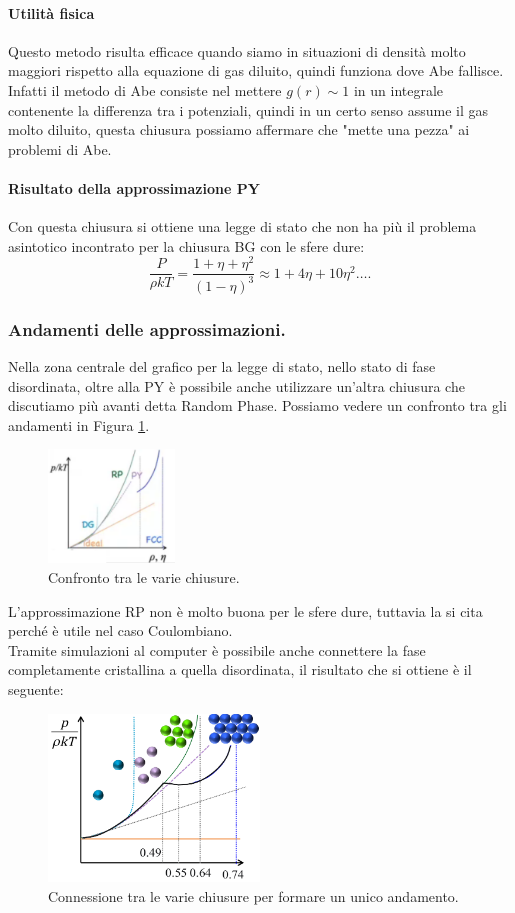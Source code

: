 \paragraph{Utilità fisica}
Questo metodo risulta efficace quando siamo in situazioni di densità molto maggiori rispetto alla equazione di gas diluito, quindi funziona dove Abe fallisce. Infatti il metodo di Abe consiste nel mettere $g(r)\sim 1$ in un integrale contenente la differenza tra i potenziali, quindi in un certo senso assume il gas molto diluito, questa chiusura possiamo affermare che "mette una pezza" ai problemi di Abe.
\paragraph{Risultato della approssimazione PY}
Con questa chiusura si ottiene una legge di stato che non ha più il problema asintotico incontrato per la chiusura BG con le sfere dure:
\[
	\frac{P}{\rho kT}=\frac{1+\eta+\eta^2}{\left( 1-\eta \right)^3}
	\approx 
	1 + 4\eta+10\eta^2\ldots
.\] 
\subsubsection{Andamenti delle approssimazioni.}
Nella zona centrale del grafico per la legge di stato, nello stato di fase disordinata, oltre alla PY è possibile anche utilizzare un'altra chiusura che discutiamo più avanti detta Random Phase. Possiamo vedere un confronto tra gli andamenti in Figura \ref{fig:chiusure-confronto}.
\begin{figure}[H]
	\centering
	\includegraphics[width=0.3\textwidth]{figures/Confronto-chiusure.png}
	\caption{Confronto tra le varie chiusure.}
	\label{fig:chiusure-confronto}
\end{figure}
L'approssimazione RP non è molto buona per le sfere dure, tuttavia la si cita perché è utile nel caso Coulombiano.\\
Tramite simulazioni al computer è possibile anche connettere la fase completamente cristallina a quella disordinata, il risultato che si ottiene è il seguente:
\begin{figure}[H]
	\centering
	\includegraphics[width=0.5\textwidth]{figures/connessione-RP-PY-BG.png}
	\caption{Connessione tra le varie chiusure per formare un unico andamento.}
	\label{fig:PY-RP-BG}
\end{figure}
